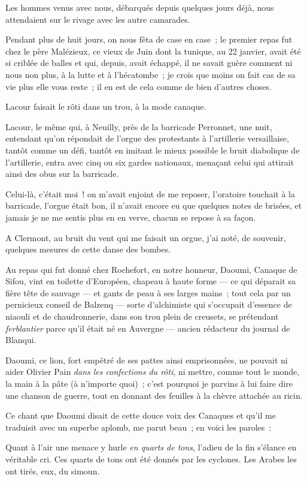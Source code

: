 \documentclass[french,twoside]{book} %
\begin{document}
Les hommes venus avec nous, débarqués depuis quelques jours déjà, nous attendaient sur le rivage avec les autre camarades.\par
Pendant plus de huit jours, on nous fêta de case en case ; le premier repas fut chez le père Malézieux, ce vieux de Juin dont la tunique, au 22 janvier, avait été si criblée de balles et qui, depuis, avait échappé, il ne savait guère comment ni nous non plus, à la lutte et à l’hécatombe ; je crois que moins on fait cas de sa vie plus elle vous reste ; il en est de cela comme de bien d’autres choses.\par
Lacour faisait le rôti dans un trou, à la mode canaque.\par
Lacour, le même qui, à Neuilly, près de la barricade Perronnet, une nuit, entendant qu’on répondait de l’orgue des protestants à l’artillerie versaillaise, tantôt comme un défi, tantôt en imitant  le mieux possible le bruit diabolique de l’artillerie, entra avec cinq ou six gardes nationaux, menaçant celui qui attirait ainsi des obus sur la barricade.\par
Celui-là, c’était moi ! on m’avait enjoint de me reposer, l’oratoire touchait à la barricade, l’orgue était bon, il n’avait encore eu que quelques notes de brisées, et jamais je ne me sentis plus en en verve, chacun se repose à sa façon.\par
A Clermont, au bruit du vent qui me faisait un orgue, j’ai noté, de souvenir, quelques mesures de cette danse des bombes.\par
Au repas qui fut donné chez Rochefort, en notre honneur, Daoumi, Canaque de Sifou, vint en toilette d’Européen, chapeau à haute forme — ce qui déparait sa fière tête de sauvage — et gants de peau à ses larges mains ; tout cela par un pernicieux conseil de Balzenq — sorte d’alchimiste qui s’occupait d’essence de niaouli et de chaudronnerie, dans son trou plein de creusets, se prétendant \emph{ferblantier} parce qu’il était né en Auvergne — ancien rédacteur du journal de Blanqui.\par
Daoumi, ce lion, fort empêtré de ses pattes ainsi emprisonnées, ne pouvait ni aider Olivier Pain \emph{dans les confections du rôti}, ni mettre, comme tout le monde, la main à la pâte (à n’importe quoi) ; c’est pourquoi je parvins à lui faire dire une  chanson de guerre, tout en donnant des feuilles à la chèvre attachée au ricin.\par
Ce chant que Daoumi disait de cette douce voix des Canaques et qu’il me traduisit avec un superbe aplomb, me parut beau ; en voici les paroles :\par
Quant à l’air une menace y hurle \emph{en quarts de tons}, l’adieu de la fin s’élance en véritable cri. Ces quarts de tons ont été donnés par les cyclones. Les Arabes les ont tirés, eux, du simoun.\par
\end{document}
